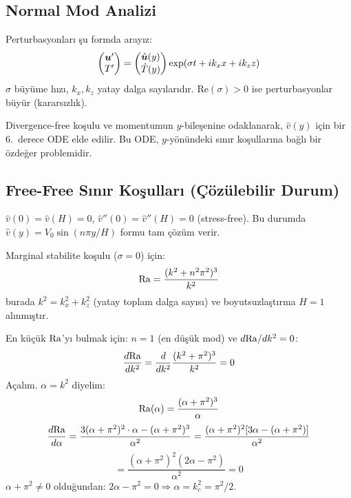 \subsection{Normal Mod Analizi}

Perturbasyonları şu formda arayız:
\begin{equation}
    \begin{pmatrix} \bm{u}' \\ T' \end{pmatrix} = \begin{pmatrix} \hat{\bm{u}}(y) \\ \hat{T}(y) \end{pmatrix} \exp\!\left( \sigma t + i k_x x + i k_z z \right)
    \label{eq:normal_modes}
\end{equation}
$\sigma$ büyüme hızı, $k_x, k_z$ yatay dalga sayılarıdır. $\text{Re}(\sigma) > 0$ ise perturbasyonlar büyür (kararsızlık).

Divergence-free koşulu ve momentumun $y$-bileşenine odaklanarak, $\hat{v}(y)$ için bir 6.\ derece ODE elde edilir. Bu ODE, $y$-yönündeki sınır koşullarına bağlı bir özdeğer problemidir.

\subsection{Free-Free Sınır Koşulları (Çözülebilir Durum)}

$\hat{v}(0) = \hat{v}(H) = 0$, $\hat{v}''(0) = \hat{v}''(H) = 0$ (stress-free). Bu durumda $\hat{v}(y) = V_0 \sin(n\pi y/H)$ formu tam çözüm verir.

Marginal stabilite koşulu ($\sigma = 0$) için:
\begin{equation}
    \mathrm{Ra} = \frac{(k^2 + n^2 \pi^2)^3}{k^2}
    \label{eq:ra_free_free}
\end{equation}
burada $k^2 = k_x^2 + k_z^2$ (yatay toplam dalga sayısı) ve boyutsuzlaştırma $H = 1$ alınmıştır.

En küçük $\mathrm{Ra}$'yı bulmak için: $n = 1$ (en düşük mod) ve $d\mathrm{Ra}/dk^2 = 0$:
\begin{equation}
    \frac{d \mathrm{Ra}}{d k^2} = \frac{d}{dk^2} \frac{(k^2 + \pi^2)^3}{k^2} = 0
\end{equation}
Açalım. $\alpha = k^2$ diyelim:
\begin{equation}
    \mathrm{Ra}(\alpha) = \frac{(\alpha + \pi^2)^3}{\alpha}
\end{equation}
\begin{equation}
    \frac{d \mathrm{Ra}}{d \alpha} = \frac{3(\alpha + \pi^2)^2 \cdot \alpha - (\alpha + \pi^2)^3}{\alpha^2} = \frac{(\alpha + \pi^2)^2 [3\alpha - (\alpha + \pi^2)]}{\alpha^2}
\end{equation}
\begin{equation}
    = \frac{(\alpha + \pi^2)^2 (2\alpha - \pi^2)}{\alpha^2} = 0
\end{equation}
$\alpha + \pi^2 \neq 0$ olduğundan: $2\alpha - \pi^2 = 0 \Rightarrow \alpha = k_c^2 = \pi^2/2$.

